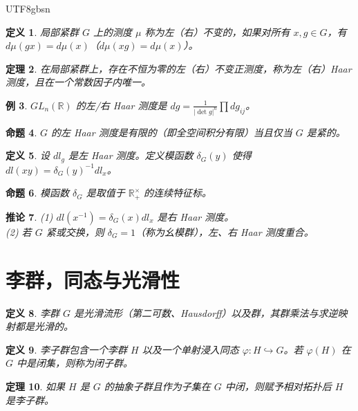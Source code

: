 \documentclass[11pt]{article}
\newtheorem{theorem}{定理}[section]
\newtheorem{proposition}[theorem]{命题}
\newtheorem{corollary}[theorem]{推论}
\newtheorem{definition}[theorem]{定义}
\newtheorem{example}[theorem]{例}
\begin{document}
\begin{CJK*}{UTF8}{gbsn}
\begin{definition}
局部紧群 $G$ 上的测度 $\mu$ 称为左（右）不变的，如果对所有 $x, g \in G$，有 $d\mu(gx) = d\mu(x)$（$d\mu(xg) = d\mu(x)$）。
\end{definition}

\begin{theorem}
在局部紧群上，存在不恒为零的左（右）不变正测度，称为左（右）Haar 测度，且在一个常数因子内唯一。
\end{theorem}

\begin{example}
$GL_n(\mathbb{R})$ 的左/右 Haar 测度是 $dg = \frac{1}{|\det g|^n} \prod dg_{ij}$。
\end{example}

\begin{proposition}
$G$ 的左 Haar 测度是有限的（即全空间积分有限）当且仅当 $G$ 是紧的。
\end{proposition}

\begin{definition}
设 $dl_g$ 是左 Haar 测度。定义模函数 $\delta_G(y)$ 使得 $dl(xy) = \delta_G(y)^{-1} dl_x$。
\end{definition}

\begin{proposition}
模函数 $\delta_G$ 是取值于 $\mathbb{R}^\times_+$ 的连续特征标。
\end{proposition}

\begin{corollary}
(1) $dl(x^{-1}) = \delta_G(x)dl_x$ 是右 Haar 测度。\\
(2) 若 $G$ 紧或交换，则 $\delta_G = 1$（称为幺模群），左、右 Haar 测度重合。
\end{corollary}

\section{李群，同态与光滑性}

\begin{definition}
李群 $G$ 是光滑流形（第二可数、Hausdorff）以及群，其群乘法与求逆映射都是光滑的。
\end{definition}

\begin{definition}
李子群包含一个李群 $H$ 以及一个单射浸入同态 $\varphi: H \hookrightarrow G$。若 $\varphi(H)$ 在 $G$ 中是闭集，则称为闭子群。
\end{definition}

\begin{theorem}
如果 $H$ 是 $G$ 的抽象子群且作为子集在 $G$ 中闭，则赋予相对拓扑后 $H$ 是李子群。
\end{theorem}


\end{CJK*}
\end{document}
